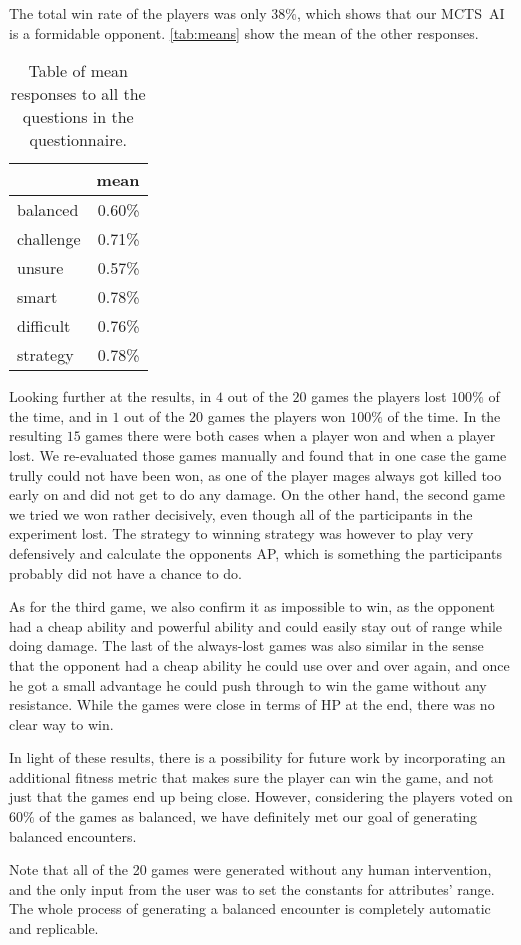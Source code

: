 The total win rate of the players was only $38\%$, which shows that our MCTS~AI
is a formidable opponent. \autoref{tab:means} show the mean of the other responses.

\begin{table}[h!]
	\centering
	\begin{tabular}{lr}
		\toprule
		{} & mean \\ 
		\midrule
		balanced        &       0.60\% \\
		challenge       &       0.71\% \\
		unsure  &       0.57\% \\
		smart   &       0.78\% \\
		difficult       &       0.76\% \\
		strategy        &       0.78\% \\
		\bottomrule
	\end{tabular}
	\caption{Table of mean responses to all the questions in the questionnaire.}
	\label{tab:means}
\end{table}

Looking further at the results, in $4$ out of the $20$ games the players lost $100\%$ of the time,
and in $1$ out of the $20$ games the players won $100\%$ of the time. In the resulting $15$ games
there were both cases when a player won and when a player lost. We re-evaluated those games manually 
and found that in one case the game trully could not have been won, as one of the player mages always
got killed too early on and did not get to do any damage. On the other hand, the second game we tried
we won rather decisively, even though all of the participants in the experiment lost. The strategy to winning
strategy was however to play very defensively and calculate the opponents AP,
which is something the participants probably did not have a chance to do.

As for the third game, we also confirm it as impossible to win, as the opponent had a cheap ability and powerful ability
and could easily stay out of range while doing damage. The last of the always-lost games was also similar
in the sense that the opponent had a cheap ability he could use over and over again, and once he got a small
advantage he could push through to win the game without any resistance. While the games were close in terms
of HP at the end, there was no clear way to win.

In light of these results, there is a possibility for future work by incorporating an additional fitness
metric that makes sure the player can win the game, and not just that the games end up being close. However,
considering the players voted on $60\%$ of the games as balanced, we have definitely met our goal of
generating balanced encounters.

Note that all of the 20 games were generated without any human intervention, and the only input from the user
was to set the constants for attributes' range. The whole process of generating a balanced encounter is completely
automatic and replicable.
